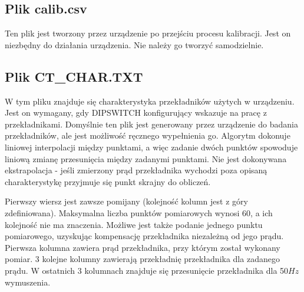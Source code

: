 \documentclass[12pt,a4paper]{article}
\begin{document}
\subsection{Plik calib.csv}
Ten plik jest tworzony przez urządzenie po przejściu procesu kalibracji. Jest on niezbędny do działania urządzenia. Nie należy go tworzyć samodzielnie.

\subsection{Plik CT\_CHAR.TXT}
W tym pliku znajduje się charakterystyka przekładników użytych w urządzeniu. Jest on wymagany, gdy DIPSWITCH konfigurujący  wskazuje na pracę z przekładnikami. Domyślnie ten plik jest generowany przez urządzenie do badania przekładników, ale jest możliwość ręcznego wypełnienia go. Algorytm dokonuje liniowej interpolacji między punktami, a więc zadanie dwóch punktów spowoduje liniową zmianę przesunięcia między zadanymi punktami. Nie jest dokonywana ekstrapolacja - jeśli zmierzony prąd przekładnika wychodzi poza opisaną charakterystykę przyjmuje się punkt skrajny do obliczeń.

Pierwszy wiersz jest zawsze pomijany (kolejność kolumn jest z góry zdefiniowana). Maksymalna liczba punktów pomiarowych wynosi 60, a ich kolejność nie ma znaczenia. Możliwe jest także podanie jednego punktu pomiarowego, uzyskując kompensację przekładnika niezależną od jego prądu. Pierwsza kolumna zawiera prąd przekładnika, przy którym został wykonany pomiar. 3 kolejne kolumny zawierają przekładnię przekładnika dla zadanego prądu. W ostatnich 3 kolumnach znajduje się przesunięcie przekładnika dla 50$Hz$ wymuszenia.
\end{document}
